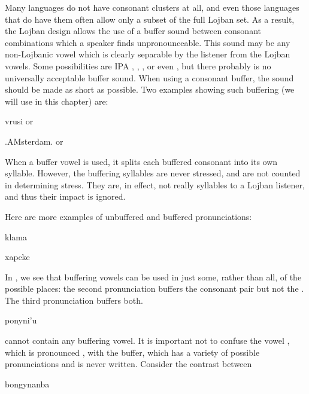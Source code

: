 Many languages do not have consonant clusters at all, and even those languages that do have them often allow only a subset of the full Lojban set. As a result, the Lojban design allows the use of a buffer sound between consonant combinations which a speaker finds unpronounceable. This sound may be any non-Lojbanic vowel which is clearly separable by the listener from the Lojban vowels. Some possibilities are IPA , , , or even , but there probably is no universally acceptable buffer sound. When using a consonant buffer, the sound should be made as short as possible. Two examples showing such buffering (we will use  in this chapter) are:
\begin{example}
vrusi\n
{}\n
or 
\end{example}

\begin{example}
.AMsterdam.\n
{}\n
or 
\end{example}

When a buffer vowel is used, it splits each buffered consonant into its own syllable. However, the buffering syllables are never stressed, and are not counted in determining stress. They are, in effect, not really syllables to a Lojban listener, and thus their impact is ignored. 

Here are more examples of unbuffered and buffered pronunciations:
\begin{example}
klama\n
{}\n
{}
\end{example}

\begin{example}
xapcke\n
{}\n
{}\n
{}
\end{example}

In , we see that buffering vowels can be used in just some, rather than all, of the possible places: the second pronunciation buffers the  consonant pair but not the . The third pronunciation buffers both.
\begin{example}
ponyni'u\n
{}
\end{example}

 cannot contain any buffering vowel. It is important not to confuse the vowel , which is pronounced , with the buffer, which has a variety of possible pronunciations and is never written. Consider the contrast between
\begin{example}
bongynanba\n
{}
\end{example}

